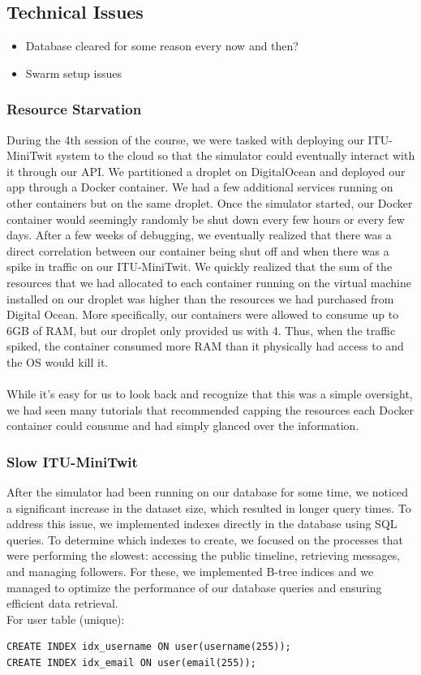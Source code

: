 \documentclass{article}
\begin{document}
\subsection{Technical Issues}

\begin{itemize}
    \item Database cleared for some reason every now and then?
    \item Swarm setup issues
\end{itemize}

\subsubsection{Resource Starvation}
During the 4th session of the course, we were tasked with deploying our ITU-MiniTwit system to the cloud so that the simulator could eventually interact with it through our API. We partitioned a droplet on DigitalOcean and deployed our app through a Docker container. We had a few additional services running on other containers but on the same droplet. Once the simulator started, our Docker container would seemingly randomly be shut down every few hours or every few days. After a few weeks of debugging, we eventually realized that there was a direct correlation between our container being shut off and when there was a spike in traffic on our ITU-MiniTwit. We quickly realized that the sum of the resources that we had allocated to each container running on the virtual machine installed on our droplet was higher than the resources we had purchased from Digital Ocean. More specifically, our containers were allowed to consume up to 6GB of RAM, but our droplet only provided us with 4. Thus, when the traffic spiked, the container consumed more RAM than it physically had access to and the OS would kill it.
\\\\
While it's easy for us to look back and recognize that this was a simple oversight, we had seen many tutorials that recommended capping the resources each Docker container could consume and had simply glanced over the information.

\subsubsection{Slow ITU-MiniTwit}
After the simulator had been running on our database for some time, we noticed a significant increase in the dataset size, which resulted in longer query times. To address this issue, we implemented indexes directly in the database using SQL queries. To determine which indexes to create, we focused on the processes that were performing the slowest: accessing the public timeline, retrieving messages, and managing followers. For these, we implemented B-tree indices and we managed to optimize the performance of our database queries and ensuring efficient data retrieval.
\\
For user table (unique):
\begin{verbatim}
CREATE INDEX idx_username ON user(username(255));
CREATE INDEX idx_email ON user(email(255));
\end{verbatim}
\end{document}
